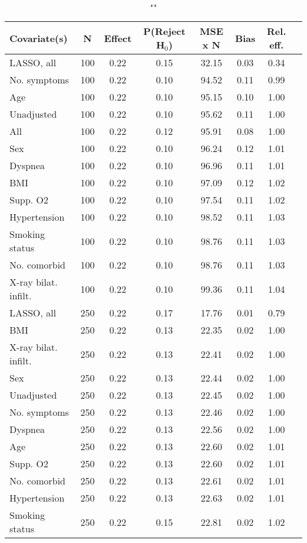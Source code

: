 \documentclass{article}
\begin{document}
{\tabcolsep=6pt  %
\begin{longtable}{lccccccc}
\caption{""} \\
Covariate(s) & N & Effect & P(Reject H$_0$) & MSE x N & Bias & Rel. eff.\\ \midrule
LASSO, all & 100 & 0.22 & 0.15 & 32.15 & 0.03 & 0.34 \\ 
No. symptoms & 100 & 0.22 & 0.10 & 94.52 & 0.11 & 0.99 \\ 
Age & 100 & 0.22 & 0.10 & 95.15 & 0.10 & 1.00 \\ 
Unadjusted & 100 & 0.22 & 0.10 & 95.62 & 0.11 & 1.00 \\ 
All & 100 & 0.22 & 0.12 & 95.91 & 0.08 & 1.00 \\ 
Sex & 100 & 0.22 & 0.10 & 96.24 & 0.12 & 1.01 \\ 
Dyspnea & 100 & 0.22 & 0.10 & 96.96 & 0.11 & 1.01 \\ 
BMI & 100 & 0.22 & 0.10 & 97.09 & 0.12 & 1.02 \\ 
Supp. O2 & 100 & 0.22 & 0.10 & 97.54 & 0.11 & 1.02 \\ 
Hypertension & 100 & 0.22 & 0.10 & 98.52 & 0.11 & 1.03 \\ 
Smoking status & 100 & 0.22 & 0.10 & 98.76 & 0.11 & 1.03 \\ 
No. comorbid & 100 & 0.22 & 0.10 & 98.76 & 0.11 & 1.03 \\ 
X-ray bilat. infilt. & 100 & 0.22 & 0.10 & 99.36 & 0.11 & 1.04 \\ \midrule 
LASSO, all & 250 & 0.22 & 0.17 & 17.76 & 0.01 & 0.79 \\ 
BMI & 250 & 0.22 & 0.13 & 22.35 & 0.02 & 1.00 \\ 
X-ray bilat. infilt. & 250 & 0.22 & 0.13 & 22.41 & 0.02 & 1.00 \\ 
Sex & 250 & 0.22 & 0.13 & 22.44 & 0.02 & 1.00 \\ 
Unadjusted & 250 & 0.22 & 0.13 & 22.45 & 0.02 & 1.00 \\ 
No. symptoms & 250 & 0.22 & 0.13 & 22.46 & 0.02 & 1.00 \\ 
Dyspnea & 250 & 0.22 & 0.13 & 22.56 & 0.02 & 1.00 \\ 
Age & 250 & 0.22 & 0.13 & 22.60 & 0.02 & 1.01 \\ 
Supp. O2 & 250 & 0.22 & 0.13 & 22.60 & 0.02 & 1.01 \\ 
No. comorbid & 250 & 0.22 & 0.13 & 22.61 & 0.02 & 1.01 \\ 
Hypertension & 250 & 0.22 & 0.13 & 22.63 & 0.02 & 1.01 \\ 
Smoking status & 250 & 0.22 & 0.15 & 22.81 & 0.02 & 1.02 \\ 

\end{longtable}}
\end{document}
